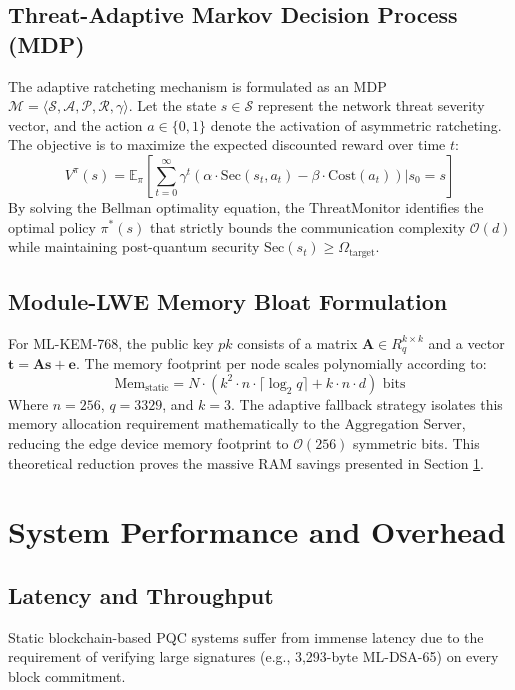 \documentclass[journal, 10pt]{IEEEtran}
\begin{document}
\subsection{Threat-Adaptive Markov Decision Process (MDP)}
The adaptive ratcheting mechanism is formulated as an MDP $\mathcal{M} = \langle \mathcal{S}, \mathcal{A}, \mathcal{P}, \mathcal{R}, \gamma \rangle$. Let the state $s \in \mathcal{S}$ represent the network threat severity vector, and the action $a \in \{0, 1\}$ denote the activation of asymmetric ratcheting. The objective is to maximize the expected discounted reward over time $t$:
\begin{equation}
V^\pi(s) = \mathbb{E}_\pi \left[ \sum_{t=0}^{\infty} \gamma^t \left( \alpha \cdot \text{Sec}(s_t, a_t) - \beta \cdot \text{Cost}(a_t) \right) \Big| s_0 = s \right]
\end{equation}
By solving the Bellman optimality equation, the ThreatMonitor identifies the optimal policy $\pi^*(s)$ that strictly bounds the communication complexity $\mathcal{O}(d)$ while maintaining post-quantum security $\text{Sec}(s_t) \geq \Omega_{\text{target}}$.

\subsection{Module-LWE Memory Bloat Formulation}
For ML-KEM-768, the public key $pk$ consists of a matrix $\mathbf{A} \in R_q^{k \times k}$ and a vector $\mathbf{t} = \mathbf{A s} + \mathbf{e}$. The memory footprint per node scales polynomially according to:
\begin{equation}
\text{Mem}_{\text{static}} = N \cdot \left( k^2 \cdot n \cdot \lceil \log_2 q \rceil + k \cdot n \cdot d \right) \text{ bits}
\end{equation}
Where $n=256$, $q=3329$, and $k=3$. The adaptive fallback strategy isolates this memory allocation requirement mathematically to the Aggregation Server, reducing the edge device memory footprint to $\mathcal{O}(256)$ symmetric bits. This theoretical reduction proves the massive RAM savings presented in Section \ref{sec:performance}.

\section{System Performance and Overhead}
\label{sec:performance}

\subsection{Latency and Throughput}
Static blockchain-based PQC systems suffer from immense latency due to the requirement of verifying large signatures (e.g., 3,293-byte ML-DSA-65) on every block commitment. 
\end{document}
